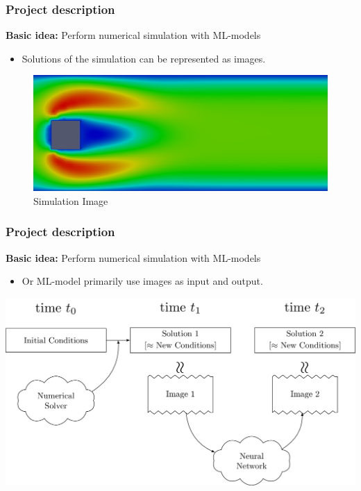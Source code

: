 \documentclass[18pt]{beamer}
\begin{document}
\begin{frame}[t]
  \frametitle{Project description}
  \begin{center}
    \large{\textbf{Basic idea:} Perform numerical simulation with ML-models}
  \end{center}
  \begin{itemize}
  \item Solutions of the simulation can be represented as images.
  \end{itemize}

  \begin{figure}[htb]
    \includegraphics[scale=0.38]{images/flow_solution}
    \caption{Simulation Image}
  \end{figure}

  
\end{frame}


\begin{frame}[t]
  \frametitle{Project description}
  \begin{center}
    \large{\textbf{Basic idea:} Perform numerical simulation with ML-models}
  \end{center}
  
  \begin{itemize}
  \item Or ML-model primarily use images as input and output.
  \end{itemize}

  \begin{center}
    \includegraphics[scale=0.15]{images/new/overview}
  \end{center}
  
\end{frame}
\end{document}
